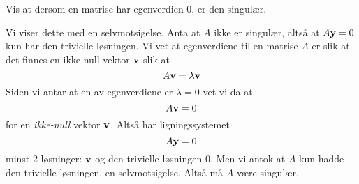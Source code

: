 \begin{oppgave}
Vis at dersom en matrise har egenverdien 0, er den singulær.
\end{oppgave}

\begin{losning}
	Vi viser dette med en selvmotsigelse. Anta at $A$ ikke er singulær, altså at $A\mathbf{y} = 0$ kun har den trivielle løsningen. Vi vet at egenverdiene til en matrise $A$ er slik at det finnes en ikke-null vektor $\mathbf{v}$ slik at
	\begin{equation*}
		A\mathbf{v} = \lambda\mathbf{v}
	\end{equation*}
	Siden vi antar at en av egenverdiene er $\lambda = 0$ vet vi da at
	\begin{equation*}
		A\mathbf{v} = 0		
	\end{equation*}
	for en \emph{ikke-null} vektor $\mathbf{v}$. Altså har ligningssystemet
	\begin{equation*}
		A\mathbf{y} = 0
	\end{equation*}
	minst 2 løsninger: $\mathbf{v}$ og den trivielle løsningen $0$. Men vi antok at $A$ kun hadde den trivielle løsningen, en selvmotsigelse. Altså må $A$ være singulær.
\end{losning}


